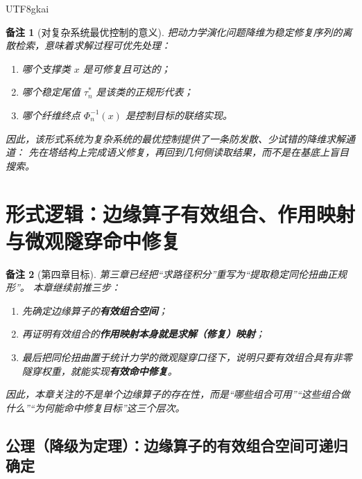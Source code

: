 \documentclass[12pt]{article}
\newtheorem{remark}{备注}[section]
\begin{document}
\begin{CJK*}{UTF8}{gkai}
\begin{remark}[对复杂系统最优控制的意义]
把动力学演化问题降维为稳定修复序列的离散检索，意味着求解过程可优先处理：
\begin{enumerate}
  \item 哪个支撑类 $x$ 是可修复且可达的；
  \item 哪个稳定尾值 $\tau_n^\ast$ 是该类的正规形代表；
  \item 哪个纤维终点 $\Phi_n^{-1}(x)$ 是控制目标的联络实现。
\end{enumerate}
因此，该形式系统为复杂系统的最优控制提供了一条防发散、少试错的降维求解通道：
先在塔结构上完成语义修复，再回到几何侧读取结果，而不是在基底上盲目搜索。
\end{remark}

\clearpage
\section{形式逻辑：边缘算子有效组合、作用映射与微观隧穿命中修复}
\label{sec:tex36-ch4}

\begin{remark}[第四章目标]
第三章已经把“求路径积分”重写为“提取稳定同伦扭曲正规形”。
本章继续前推三步：
\begin{enumerate}
  \item 先确定边缘算子的\textbf{有效组合空间}；
  \item 再证明有效组合的\textbf{作用映射本身就是求解（修复）映射}；
  \item 最后把同伦扭曲置于统计力学的微观隧穿口径下，说明只要有效组合具有非零隧穿权重，就能实现\textbf{有效命中修复}。
\end{enumerate}
因此，本章关注的不是单个边缘算子的存在性，而是“哪些组合可用”“这些组合做什么”“为何能命中修复目标”这三个层次。
\end{remark}

\subsection{公理（降级为定理）：边缘算子的有效组合空间可递归确定}
\label{subsec:tex36-effective-combination-space}


\end{CJK*}
\end{document}
